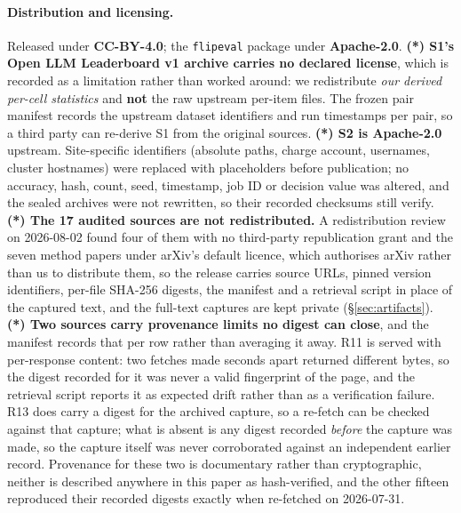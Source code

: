\paragraph{Distribution and licensing.} Released under \textbf{CC-BY-4.0};
the \texttt{flipeval} package under \textbf{Apache-2.0}.
\textbf{(*) S1's Open LLM Leaderboard v1 archive carries no declared license},
which is recorded as a limitation rather than worked around: we redistribute
\emph{our derived per-cell statistics} and \textbf{not} the raw upstream
per-item files. The frozen pair manifest records the upstream dataset
identifiers and run timestamps per pair, so a third party can re-derive S1 from
the original sources.
\textbf{(*) S2 is Apache-2.0} upstream. Site-specific identifiers (absolute
paths, charge account, usernames, cluster hostnames) were replaced with
placeholders before publication; no accuracy, hash, count, seed, timestamp, job
ID or decision value was altered, and the sealed archives were not rewritten, so
their recorded checksums still verify.
\textbf{(*) The 17 audited sources are not redistributed.} A redistribution
review on 2026-08-02 found four of them with no third-party republication grant
and the seven method papers under arXiv's default licence, which authorises
arXiv rather than us to distribute them, so the release carries source URLs,
pinned version identifiers, per-file SHA-256 digests, the manifest and a
retrieval script in place of the captured text, and the full-text captures are
kept private (\S\ref{sec:artifacts}). \textbf{(*) Two sources carry provenance
limits no digest can close}, and the manifest records that per row rather than
averaging it away.
R11 is served with per-response content: two fetches made seconds apart returned
different bytes, so the digest recorded for it was never a valid fingerprint of
the page, and the retrieval script reports it as expected drift rather than as a
verification failure. R13 does carry a digest for the archived capture, so a
re-fetch can be checked against that capture; what is absent is any digest
recorded \emph{before} the capture was made, so the capture itself was never
corroborated against an independent earlier record. Provenance for these two is
documentary rather than cryptographic, neither is described anywhere in this
paper as hash-verified, and the other fifteen reproduced their recorded digests
exactly when re-fetched on 2026-07-31.

